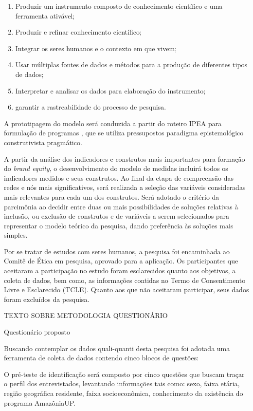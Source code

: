 \begin{enumerate}[label=(\roman*)]
\item Produzir um instrumento composto de conhecimento científico e uma ferramenta
ativável;
\item Produzir e refinar conhecimento científico;
\item Integrar os seres humanos e o contexto em que vivem;
\item Usar múltiplas fontes de dados e métodos para a produção de diferentes tipos de dados;
\item Interpretar e analisar os dados para elaboração do instrumento;
\item garantir a rastreabilidade do processo de pesquisa.
\end{enumerate}

A prototipagem do modelo será conduzida a partir do roteiro IPEA para formulação de programas \cite{Cassiolato2010ComoAvaliacao}, que se utiliza pressupostos paradigma epistemológico construtivista pragmático.

A partir da análise dos indicadores e construtos mais importantes para formação do \textit{brand equity}, o desenvolvimento do modelo de medidas incluirá todos os indicadores medidos e seus construtos. Ao final da etapa de compreensão das redes e nós mais significativos, será realizada a seleção das variáveis consideradas mais relevantes para cada um dos construtos. Será adotado o critério da parcimônia ao decidir entre duas ou mais possibilidades de soluções relativas à inclusão, ou exclusão de construtos e de variáveis a serem selecionados para representar o modelo teórico da pesquisa, dando preferência às soluções mais simples.

Por se tratar de estudos com seres humanos, a pesquisa foi encaminhada ao Comitê de Ética em pesquisa, aprovado para a aplicação. Os participantes que aceitaram a participação no estudo foram esclarecidos quanto aos objetivos, a coleta de dados, bem como, as informações contidas no Termo de Consentimento Livre e Esclarecido (TCLE). Quanto aos que não aceitaram participar, seus dados foram excluídos da pesquisa.


TEXTO SOBRE METODOLOGIA QUESTIONÁRIO


Questionário proposto

Buscando contemplar os dados quali-quanti desta pesquisa foi adotada uma ferramenta de coleta de dados contendo cinco blocos de questões:

O pré-teste de identificação será composto por cinco questões que buscam traçar o perfil dos entrevistados, levantando informações tais como: sexo, faixa etária, região geográfica residente, faixa socioeconômica, conhecimento da existência do programa AmazôniaUP. 

